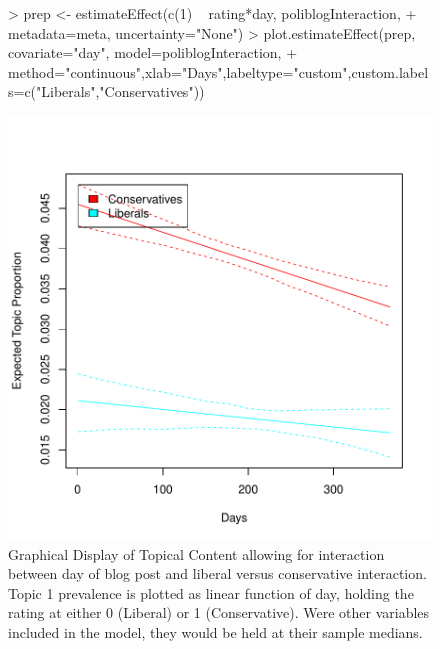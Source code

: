 \documentclass[nojss]{jss}
\begin{document}
\begin{Schunk}
\end{Schunk}

\begin{figure}[t!]
\begin{center}
\begin{Schunk}
\begin{Sinput}
> prep <- estimateEffect(c(1) ~ rating*day, poliblogInteraction,
+         metadata=meta, uncertainty="None")
> plot.estimateEffect(prep, covariate="day", model=poliblogInteraction,
+         method="continuous",xlab="Days",labeltype="custom",custom.labels=c("Liberals","Conservatives"))
\end{Sinput}
\end{Schunk}
\includegraphics{stmVignette-019}
\caption{Graphical Display of Topical Content allowing for interaction between day of blog post and liberal versus conservative interaction. Topic 1 prevalence is plotted as linear function of day, holding the rating at either 0 (Liberal) or 1 (Conservative). Were other variables included in the model, they would be held at their sample medians.}
\label{fig:spline2}
\end{center}
\end{figure}
\end{document}
